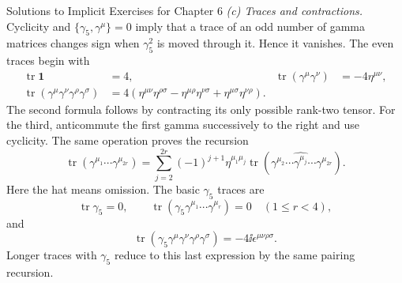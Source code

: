 \begin{bankssolutions}{Solutions to Implicit Exercises for Chapter 6}
\textit{(c) Traces and contractions.}
Cyclicity and \(\{\gamma_5,\gamma^\mu\}=0\) imply that a trace of an odd
number of gamma matrices changes sign when \(\gamma_5^2\) is moved through
it.  Hence it vanishes.  The even traces begin with
\begin{align*}
 \operatorname{tr}\mathbf1&=4,
 &\operatorname{tr}(\gamma^\mu\gamma^\nu)&=-4\eta^{\mu\nu},\\
 \operatorname{tr}(\gamma^\mu\gamma^\nu\gamma^\rho\gamma^\sigma)
 &=4\left(\eta^{\mu\nu}\eta^{\rho\sigma}
 -\eta^{\mu\rho}\eta^{\nu\sigma}
 +\eta^{\mu\sigma}\eta^{\nu\rho}\right).
\end{align*}
The second formula follows by contracting its only possible rank-two tensor.
For the third, anticommute the first gamma successively to the right and use
cyclicity.  The same operation proves the recursion
\begin{equation*}
 \operatorname{tr}(\gamma^{\mu_1}\cdots\gamma^{\mu_{2r}})
 =\sum_{j=2}^{2r}(-1)^{j+1}\eta^{\mu_1\mu_j}
 \operatorname{tr}(\gamma^{\mu_2}\cdots
 \widehat{\gamma^{\mu_j}}\cdots\gamma^{\mu_{2r}}).
\end{equation*}
Here the hat means omission.  The basic \(\gamma_5\) traces are
\begin{equation*}
 \operatorname{tr}\gamma_5=0,
 \qquad
 \operatorname{tr}(\gamma_5\gamma^{\mu_1}\cdots\gamma^{\mu_r})=0
 \quad(1\leq r<4),
\end{equation*}
and
\begin{equation*}
 \operatorname{tr}(\gamma_5\gamma^\mu\gamma^\nu
 \gamma^\rho\gamma^\sigma)=-4\ii\epsilon^{\mu\nu\rho\sigma}.
\end{equation*}
Longer traces with \(\gamma_5\) reduce to this last expression by the same
pairing recursion.


\end{bankssolutions}
